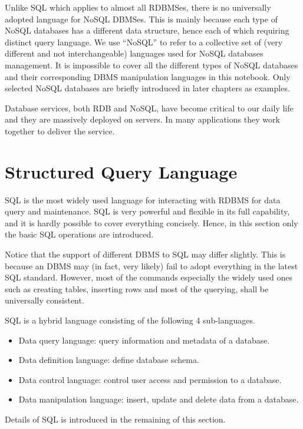 Unlike SQL which applies to almost all RDBMSes, there is no universally adopted language for NoSQL DBMSes. This is mainly because each type of NoSQL databases has a different data structure, hence each of which requiring distinct query language. We use ``NoSQL'' to refer to a collective set of (very different and not interchangeable) languages used for NoSQL databases management. It is impossible to cover all the different types of NoSQL databases and their corresponding DBMS manipulation languages in this notebook. Only selected NoSQL databases are briefly introduced in later chapters as examples.

Database services, both RDB and NoSQL, have become critical to our daily life and they are massively deployed on servers. In many applications they work together to deliver the service.

\section{Structured Query Language} \label{sec:sql}

SQL is the most widely used language for interacting with RDBMS for data query and maintenance. SQL is very powerful and flexible in its full capability, and it is hardly possible to cover everything concisely. Hence, in this section only the basic SQL operations are introduced.

Notice that the support of different DBMS to SQL may differ slightly. This is because an DBMS may (in fact, very likely) fail to adopt everything in the latest SQL standard. However, most of the commands especially the widely used ones such as creating tables, inserting rows and most of the querying, shall be universally consistent.

SQL is a hybrid language consisting of the following 4 sub-languages.
\begin{itemize}
	\item Data query language: query information and metadata of a database.
	\item Data definition language: define database schema.
	\item Data control language: control user access and permission to a database.
	\item Data manipulation language: insert, update and delete data from a database.
\end{itemize}

Details of SQL is introduced in the remaining of this section.

